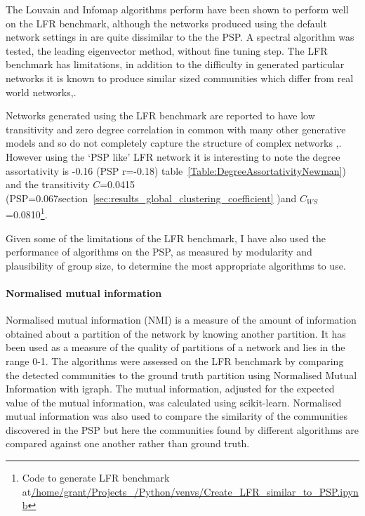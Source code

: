 The Louvain and Infomap algorithms perform have been shown to perform well on the LFR benchmark\cite{lancichinetti2008benchmark},\cite{lancichinetti2009community} although the networks produced using the default network settings in\cite{lancichinetti2008benchmark} are quite dissimilar to the the PSP.
 A spectral algorithm was tested, the leading eigenvector method\cite{newman2006finding}, without fine tuning step\cite{lancichinetti2008benchmark}. The LFR benchmark has limitations, in addition to the difficulty in generated particular networks it is known to produce similar sized communities which differ from  real world networks\cite{orman2013towards},\cite{aldecoa2013exploring}. 

Networks generated using the LFR benchmark are reported to have low transitivity and zero degree correlation in common with many other generative models and so do not completely capture the structure of complex networks \cite{orman2013towards},\cite{orman2009comparison}. However using the `PSP like' LFR network it is interesting to note the degree assortativity is -0.16  (PSP r=-0.18) table~\ref{Table:DegreeAssortativityNewman}) and the transitivity $C$=0.0415  (PSP=0.067section~\ref{sec:results_global_clustering_coefficient} )and  $C_{WS}$ =0.0810\footnote{\tiny Code to generate LFR benchmark at\url{/home/grant/Projects_/Python/venvs/Create_LFR_similar_to_PSP.ipynb}}.

Given some of the limitations of the LFR benchmark, I have also used the performance of algorithms on the PSP, as measured by modularity and plausibility of group size, to determine the most appropriate algorithms to use. 


\paragraph{Normalised mutual information}
Normalised mutual information (NMI) is a measure of the amount of information obtained about a partition of the network by knowing another partition. It has been used as a measure of the quality of partitions of a network\cite{danon2005comparing} and lies in the range 0-1. The algorithms were assessed on the LFR benchmark by comparing the detected communities to the ground truth partition using Normalised Mutual Information with igraph. The mutual information, adjusted for the expected value of the mutual information\cite{vinh2010information}, was calculated using scikit-learn\cite{abraham2014machine}. Normalised mutual information was also used to compare the similarity of the communities discovered in the PSP but here the communities found by different algorithms are compared against one another rather than ground truth. 




